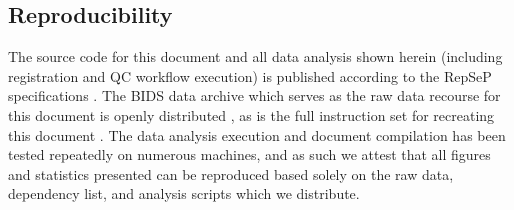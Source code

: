 \subsection{Reproducibility}

The source code for this document and all data analysis shown herein (including registration and QC workflow execution) is published according to the RepSeP specifications \cite{repsep}.
The BIDS \cite{bids} data archive which serves as the raw data recourse for this document is openly distributed \cite{opfvta_bidsdata}, as is the full instruction set for recreating this document \cite{me}.
The data analysis execution and document compilation has been tested repeatedly on numerous machines, and as such we attest that all figures and statistics presented can be reproduced based solely on the raw data, dependency list, and analysis scripts which we distribute.
